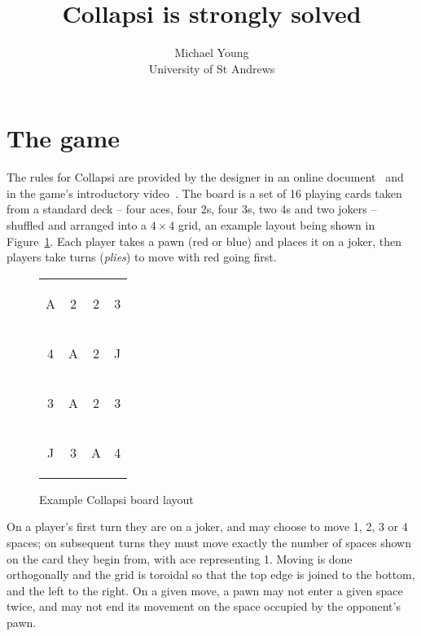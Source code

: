 \documentclass[a4paper, twocolumn]{article}
\title{Collapsi is strongly solved}
\author{Michael Young\\University of St Andrews}
\newcommand\card[1]{\begin{tcolorbox}#1\end{tcolorbox}}
\newcommand\board[8]{
  \setlength{\tabcolsep}{0.1cm}
  \begin{tabular}{c c c c}
    \card{#1} & \card{#2} & \card{#3} & \card{#4} \\
    \card{#5} & \card{#6} & \card{#7} & \card{#8} \\
    \boardmore
}
\newcommand\boardmore[8]{
    \card{#1} & \card{#2} & \card{#3} & \card{#4} \\
    \card{#5} & \card{#6} & \card{#7} & \card{#8}
  \end{tabular}
}
\begin{document}
\maketitle



\section{The game}

The rules for Collapsi are provided by the designer in an online
document~\cite{rules} and in the game's introductory video~\cite{youtube}. The
board is a set of 16 playing cards taken from a standard deck -- four aces, four
2s, four 3s, two 4s and two jokers -- shuffled and arranged into a $4\times 4$
grid, an example layout being shown in Figure~\ref{fig:board}. Each player takes
a pawn (red or blue) and places it on a joker, then players take turns
(\textit{plies}) to move with red going first.

\begin{figure}[ht]
  \centering
  \board A223 4A2J 3A23 J3A4
  \caption{Example Collapsi board layout}
  \label{fig:board}
\end{figure}

On a player's first turn they are on a joker, and may choose to move 1, 2, 3 or
4 spaces; on subsequent turns they must move exactly the number of spaces shown
on the card they begin from, with ace representing 1. Moving is done
orthogonally and the grid is toroidal so that the top edge is joined to the
bottom, and the left to the right. On a given move, a pawn may not enter a given
space twice, and may not end its movement on the space occupied by the
opponent's pawn.
\end{document}
